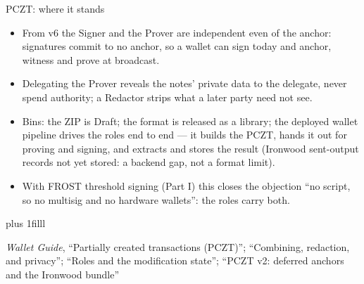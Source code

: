\documentclass[aspectratio=169,11pt]{beamer}
\newcommand{\src}[1]{\par\vskip0pt plus 1filll
  {\fontsize{6}{7.2}\selectfont\color{arbdim}\raggedright #1\par}}
\begin{document}
\begin{frame}{PCZT: where it stands}
\small
\begin{itemize}
  \item From v6 the Signer and the Prover are independent even of the
    anchor: signatures commit to no anchor, so a wallet can sign today
    and anchor, witness and prove at broadcast.
  \item Delegating the Prover reveals the notes' private data to the
    delegate, never spend authority; a Redactor strips what a later
    party need not see.
  \item Bins: the ZIP is Draft; the format is released as a library;
    the deployed wallet pipeline drives the roles end to end --- it
    builds the PCZT, hands it out for proving and signing, and extracts
    and stores the result (Ironwood sent-output records not yet stored:
    a backend gap, not a format limit).
  \item With FROST threshold signing (Part I) this closes the objection
    ``no script, so no multisig and no hardware wallets'': the roles
    carry both.
\end{itemize}
\src{\emph{Wallet Guide}, ``Partially created transactions (PCZT)'';
  ``Combining, redaction, and privacy''; ``Roles and the modification state'';
  ``PCZT v2: deferred anchors and the Ironwood bundle''}
\end{frame}
\end{document}
